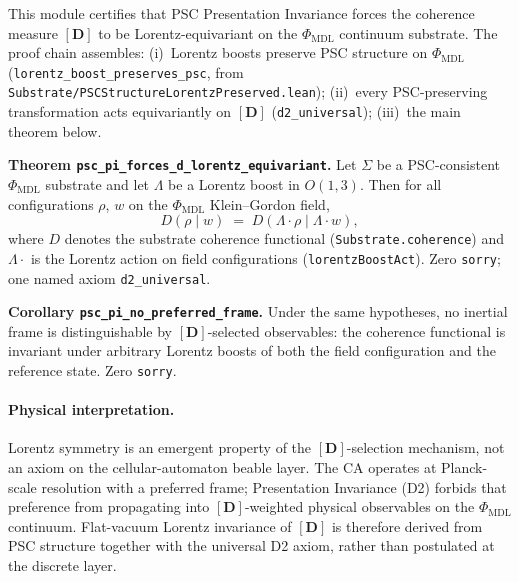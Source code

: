 \documentclass[11pt,a4paper]{article}
\newenvironment{keybox}[1]{%
  \Needspace*{8\baselineskip}%
  \begin{tcolorbox}[
    enhanced,
    breakable=false,
    colback=blue!5,
    colframe=blue!45!black,
    coltitle=black,
    colbacktitle=blue!14,
    boxrule=0.85pt,
    arc=2.5pt,
    left=9pt, right=9pt, top=6pt, bottom=6pt,
    titlerule=0.55pt,
    fonttitle=\bfseries,
    title={#1},
    before upper=\raggedright,
    before skip=0.9\baselineskip,
    after skip=0.9\baselineskip
  ]%
}{%
  \end{tcolorbox}%
}
\theoremstyle{definition}
\begin{document}
This module certifies that PSC Presentation Invariance forces the coherence
measure $[\mathbf{D}]$ to be Lorentz-equivariant on the $\Phi_{\mathrm{MDL}}$
continuum substrate.  The proof chain assembles: (i)~Lorentz boosts preserve
PSC structure on $\Phi_{\mathrm{MDL}}$ (\lstinline|lorentz_boost_preserves_psc|,
from \texttt{Substrate/PSCStructureLorentzPreserved.lean}); (ii)~every
PSC-preserving transformation acts equivariantly on $[\mathbf{D}]$
(\lstinline|d2_universal|); (iii)~the main theorem below.

\begin{keybox}{PSC/PI forces $[\mathbf{D}]$ Lorentz equivariance (CatAL)}
\textbf{Theorem \lstinline|psc_pi_forces_d_lorentz_equivariant|.}
Let $\Sigma$ be a PSC-consistent $\Phi_{\mathrm{MDL}}$ substrate and let
$\Lambda$ be a Lorentz boost in $O(1,3)$.  Then for all configurations
$\rho$, $w$ on the $\Phi_{\mathrm{MDL}}$ Klein--Gordon field,
\[
  D(\rho \mid w) \;=\; D(\Lambda\cdot\rho \mid \Lambda\cdot w),
\]
where $D$ denotes the substrate coherence functional
(\lstinline|Substrate.coherence|) and $\Lambda\cdot$ is the Lorentz action
on field configurations (\lstinline|lorentzBoostAct|).
Zero \lstinline|sorry|; one named axiom \lstinline|d2_universal|.
\end{keybox}

\begin{keybox}{No preferred inertial frame for $[\mathbf{D}]$ observables (CatAL)}
\textbf{Corollary \lstinline|psc_pi_no_preferred_frame|.}
Under the same hypotheses, no inertial frame is distinguishable by
$[\mathbf{D}]$-selected observables: the coherence functional is invariant
under arbitrary Lorentz boosts of both the field configuration and the
reference state.
Zero \lstinline|sorry|.
\end{keybox}

\paragraph{Physical interpretation.}
Lorentz symmetry is an emergent property of the $[\mathbf{D}]$-selection
mechanism, not an axiom on the cellular-automaton beable layer.  The CA
operates at Planck-scale resolution with a preferred frame; Presentation
Invariance (D2) forbids that preference from propagating into
$[\mathbf{D}]$-weighted physical observables on the $\Phi_{\mathrm{MDL}}$
continuum.  Flat-vacuum Lorentz invariance of $[\mathbf{D}]$ is therefore
derived from PSC structure together with the universal D2 axiom, rather
than postulated at the discrete layer.
\end{document}
